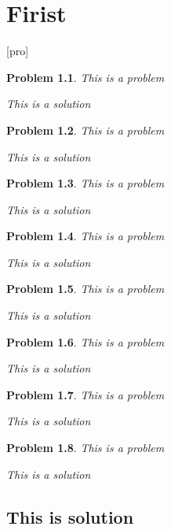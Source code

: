 \documentclass[12pt,openany,twoside]{book}
\newtheorem{pro}{Problem}[chapter]
\begin{document}
\chapter{Firist }
\thispagestyle{empty}
[pro]
\begin{pro}
This is a problem
\begin{loigiai}
This is a solution
\end{loigiai}
\end{pro}

\begin{pro}
This is a problem
\begin{loigiai}
This is a solution
\end{loigiai}
\end{pro}

\begin{pro}
This is a problem
\begin{loigiai}
This is a solution
\end{loigiai}
\end{pro}

\begin{pro}
This is a problem
\begin{loigiai}
This is a solution
\end{loigiai}
\end{pro}

\begin{pro}
This is a problem
\begin{loigiai}
This is a solution
\end{loigiai}
\end{pro}

\begin{pro}
This is a problem
\begin{loigiai}
This is a solution
\end{loigiai}
\end{pro}

\begin{pro}
This is a problem
\begin{loigiai}
This is a solution
\end{loigiai}
\end{pro}

\begin{pro}
This is a problem
\begin{loigiai}
This is a solution
\end{loigiai}
\end{pro}

\section{This is solution}

\end{document}
